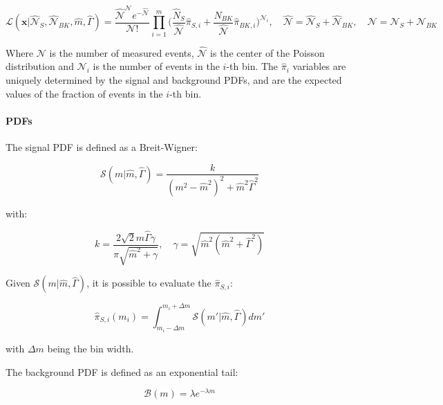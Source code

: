 \begin{refsection}
\begin{equation}
    \mathcal{L}(\textbf{x}|\hat{\mathcal{N}}_{S}, \hat{\mathcal{N}}_{BK}, \hat{m}, \hat{\Gamma}) = \frac{\hat{\mathcal{N}}^\mathcal{N} e^{-\hat{\mathcal{N}}} }{\mathcal{N}!} \prod_{i=1}^{m} \Big( \frac{\hat{N}_S}{\hat{\mathcal{N}}} \hat{\pi}_{S, i} + \frac{\hat{N}_{BK}}{\hat{\mathcal{N}}} \hat{\pi}_{BK, i} \Big)^{\mathcal{N}_i}, \quad \hat{\mathcal{N}} = \hat{\mathcal{N}}_{S} + \hat{\mathcal{N}}_{BK}, \quad \mathcal{N} = \mathcal{N}_{S} + \mathcal{N}_{BK}
\end{equation}

\noindent Where $\mathcal{N}$ is the number of measured events, $\hat{\mathcal{N}}$ is the center of the Poisson distribution and $\mathcal{N}_i$ is the number of events in the $i$-th bin.
The $\hat{\pi}_i$ variables are uniquely determined by the signal and background PDFs, and are the expected values of the fraction of events in the $i$-th bin.

\paragraph{PDFs}
The signal PDF is defined as a Breit-Wigner:

\begin{equation}
	\mathcal{S}(m | \hat{m}, \hat{\Gamma}) = \frac{k}{(m^2 - \hat{m}^2)^2 + \hat{m}^2\hat{\Gamma}^2}
\end{equation}

with:

\begin{equation}
	k = \frac{2\sqrt{2}\hat{m}\hat{\Gamma}\gamma}{\pi\sqrt{\hat{m}^2 + \gamma}}, \quad \gamma = \sqrt{\hat{m}^2 ( \hat{m}^2 + \hat{\Gamma}^2)}
\end{equation}

Given $\mathcal{S}(m | \hat{m}, \hat{\Gamma})$, it is possible to evaluate the $\hat{\pi}_{S,i}$:

\begin{equation}
	\hat{\pi}_{S,i} (m_i) = \int_{m_i - \Delta m}^{m_i + \Delta m} \mathcal{S}(m\prime | \hat{m}, \hat{\Gamma}) dm\prime
\end{equation}

with $\Delta m$ being the bin width.

The background PDF is defined as an exponential tail:

\begin{equation}
	\mathcal{B}(m) = \lambda e^{-\lambda m}
\end{equation}



\end{refsection}
